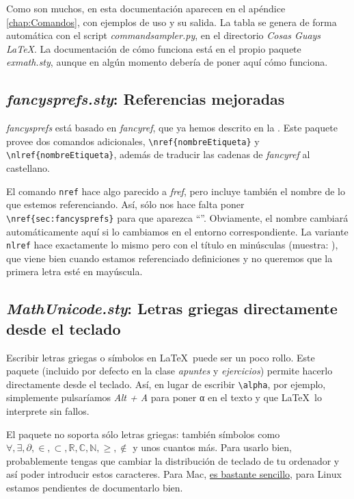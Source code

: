 Como son muchos, en esta documentación aparecen en el apéndice \ref{chap:Comandos}, con ejemplos de uso y su salida. La tabla se genera de forma automática con el script \textit{commandsampler.py}, en el directorio \textit{Cosas Guays LaTeX}. La documentación de cómo funciona está en el propio paquete \textit{exmath.sty}, aunque en algún momento debería de poner aquí cómo funciona.

\subsection{\textit{fancysprefs.sty}: Referencias mejoradas}
\label{sec:fancysprefs}

\textit{fancysprefs} está basado en \textit{fancyref}, que ya hemos descrito en la . Este paquete provee dos comandos adicionales, \verb|\nref{nombreEtiqueta}| y \verb|\nlref{nombreEtiqueta}|, además de traducir las cadenas de \textit{fancyref} al castellano.

El comando \texttt{nref} hace algo parecido a \textit{fref}, pero incluye también el nombre de lo que estemos referenciando. Así, sólo nos hace falta poner \verb|\nref{sec:fancysprefs}| para que aparezca ``''. Obviamente, el nombre cambiará automáticamente aquí si lo cambiamos en el entorno correspondiente. La variante \texttt{nlref} hace exactamente lo mismo pero con el título en minúsculas (muestra: ), que viene bien cuando estamos referenciado definiciones y no queremos que la primera letra esté en mayúscula.

\subsection{\textit{MathUnicode.sty}: Letras griegas directamente desde el teclado}
\label{sec:MathUnicode}

Escribir letras griegas o símbolos en \LaTeX\ puede ser un poco rollo. Este paquete (incluido por defecto en la clase \textit{apuntes} y \textit{ejercicios}) permite hacerlo directamente desde el teclado. Así, en lugar de escribir \verb|\alpha|, por ejemplo, simplemente pulsaríamos \textit{Alt + A} para poner α en el texto y que \LaTeX\ lo interprete sin fallos.

El paquete no soporta sólo letras griegas: también símbolos como $∀, ∃, ∂, ∈, ⊂, ℝ, ℂ, ℕ, ≥, ∉$ y unos cuantos más. Para usarlo bien, probablemente tengas que cambiar la distribución de teclado de tu ordenador y así poder introducir estos caracteres. Para Mac, \href{https://github.com/gjulianm/MathUnicode}{es bastante sencillo}, para Linux estamos pendientes de documentarlo bien.

